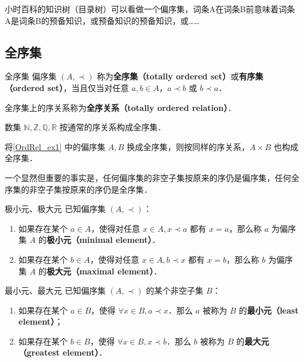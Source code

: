 \begin{example}{}
小时百科的知识树（目录树）可以看做一个偏序集，词条A在词条B前意味着词条A是词条B的预备知识，或预备知识的预备知识，或……
\end{example}

\subsection{全序集}

\begin{definition}{全序集}
偏序集 $(A,\prec)$ 称为\textbf{全序集（totally ordered set）}或\textbf{有序集（ordered set）}，当且仅当对任意 $a,b \in A$，$a \prec b$ 或 $b \prec a$．
\end{definition}
全序集上的序关系称为\textbf{全序关系（totally ordered relation）}．
\begin{example}{}
数集 $\mathbb{N},\mathbb{Z},\mathbb{Q},\mathbb{R}$ 按通常的序关系构成全序集．
\end{example}
\begin{example}{}
将\autoref{OrdRel_ex1} 中的偏序集 $A,B$ 换成全序集，则按同样的序关系，$A\times B$ 也构成全序集．
\end{example}

一个显然但重要的事实是，任何偏序集的非空子集按原来的序仍是偏序集，任何全序集的非空子集按原来的序仍是全序集．

\begin{definition}{极小元、极大元}
已知偏序集 $(A,\prec)$：
\begin{enumerate}
\item 如果存在某个 $a \in A$，使得对任意 $x \in A, x\prec a$ 都有 $x = a$，那么称 $a$ 为偏序集 $A$ 的\textbf{极小元（minimal element）}．
\item 如果存在某个 $b \in A$，使得对任意 $x \in A, b\prec x$ 都有 $x = b$，那么称 $b$ 为偏序集 $A$ 的\textbf{极大元（maximal element）}．
\end{enumerate}
\end{definition}

\begin{definition}{最小元、最大元}
已知偏序集 $(A,\prec)$ 的某个非空子集 $B$：
\begin{enumerate}
\item 如果存在某个 $a \in B$，使得 $\forall x \in B, a \prec x$．那么 $a$ 被称为 $B$ 的\textbf{最小元（least element）}；
\item 如果存在某个 $b \in B$，使得 $\forall x \in B, x \prec b$．那么 $b$ 被称为 $B$ 的\textbf{最大元（greatest element）}．
\end{enumerate}
\end{definition}

